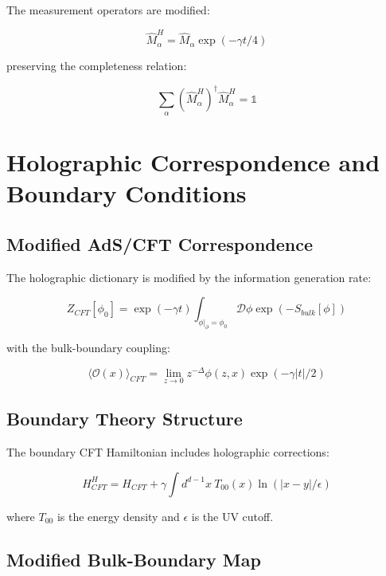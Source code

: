\documentclass[12pt]{article}
\theoremstyle{plain}
\theoremstyle{definition}
\theoremstyle{remark}
\begin{document}
The measurement operators are modified:

\begin{equation}
\hat{M}_{\alpha}^H = \hat{M}_{\alpha}\exp(-\gamma t/4)
\end{equation}

preserving the completeness relation:

\begin{equation}
\sum_{\alpha} (\hat{M}_{\alpha}^H)^{\dagger}\hat{M}_{\alpha}^H = \mathbb{1}
\end{equation}

\section{Holographic Correspondence and Boundary Conditions}

\subsection{Modified AdS/CFT Correspondence}

The holographic dictionary is modified by the information generation rate:

\begin{equation}
Z_{CFT}[\phi_0] = \exp(-\gamma t)\int_{\phi|_{\partial} = \phi_0} \mathcal{D}\phi \exp(-S_{bulk}[\phi])
\end{equation}

with the bulk-boundary coupling:

\begin{equation}
\langle \mathcal{O}(x) \rangle_{CFT} = \lim_{z \to 0} z^{-\Delta} \phi(z,x)\exp(-\gamma|t|/2)
\end{equation}

\subsection{Boundary Theory Structure}

The boundary CFT Hamiltonian includes holographic corrections:

\begin{equation}
H_{CFT}^H = H_{CFT} + \gamma\int d^{d-1}x \: T_{00}(x)\ln(|x-y|/\epsilon)
\end{equation}

where $T_{00}$ is the energy density and $\epsilon$ is the UV cutoff.

\subsection{Modified Bulk-Boundary Map}
\end{document}
